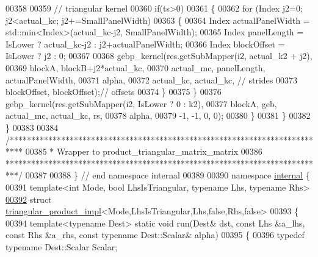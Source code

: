 \begin{DoxyCode}
00358 
00359         \textcolor{comment}{// triangular kernel}
00360         \textcolor{keywordflow}{if}(ts>0)
00361         \{
00362           \textcolor{keywordflow}{for} (Index j2=0; j2<actual\_kc; j2+=SmallPanelWidth)
00363           \{
00364             Index actualPanelWidth = std::min<Index>(actual\_kc-j2, SmallPanelWidth);
00365             Index panelLength = IsLower ? actual\_kc-j2 : j2+actualPanelWidth;
00366             Index blockOffset = IsLower ? j2 : 0;
00367 
00368             gebp\_kernel(res.getSubMapper(i2, actual\_k2 + j2),
00369                         blockA, blockB+j2*actual\_kc,
00370                         actual\_mc, panelLength, actualPanelWidth,
00371                         alpha,
00372                         actual\_kc, actual\_kc,  \textcolor{comment}{// strides}
00373                         blockOffset, blockOffset);\textcolor{comment}{// offsets}
00374           \}
00375         \}
00376         gebp\_kernel(res.getSubMapper(i2, IsLower ? 0 : k2),
00377                     blockA, geb, actual\_mc, actual\_kc, rs,
00378                     alpha,
00379                     -1, -1, 0, 0);
00380       \}
00381     \}
00382   \}
00383 
00384 \textcolor{comment}{/***************************************************************************}
00385 \textcolor{comment}{* Wrapper to product\_triangular\_matrix\_matrix}
00386 \textcolor{comment}{***************************************************************************/}
00387 
00388 \} \textcolor{comment}{// end namespace internal}
00389 
00390 \textcolor{keyword}{namespace }\hyperlink{namespaceinternal}{internal} \{
00391 \textcolor{keyword}{template}<\textcolor{keywordtype}{int} Mode, \textcolor{keywordtype}{bool} LhsIsTriangular, \textcolor{keyword}{typename} Lhs, \textcolor{keyword}{typename} Rhs>
\hyperlink{struct_eigen_1_1internal_1_1triangular__product__impl_3_01_mode_00_01_lhs_is_triangular_00_01_lh44afb66a9d3654cd1beb7f851ecab864}{00392} \textcolor{keyword}{struct }\hyperlink{struct_eigen_1_1internal_1_1triangular__product__impl}{triangular\_product\_impl}<Mode,LhsIsTriangular,Lhs,false,Rhs,false>
00393 \{
00394   \textcolor{keyword}{template}<\textcolor{keyword}{typename} Dest> \textcolor{keyword}{static} \textcolor{keywordtype}{void} run(Dest& dst, \textcolor{keyword}{const} Lhs &a\_lhs, \textcolor{keyword}{const} Rhs &a\_rhs, \textcolor{keyword}{const} \textcolor{keyword}{typename} 
      Dest::Scalar& alpha)
00395   \{
00396     \textcolor{keyword}{typedef} \textcolor{keyword}{typename} Dest::Scalar     Scalar;

\end{DoxyCode}
